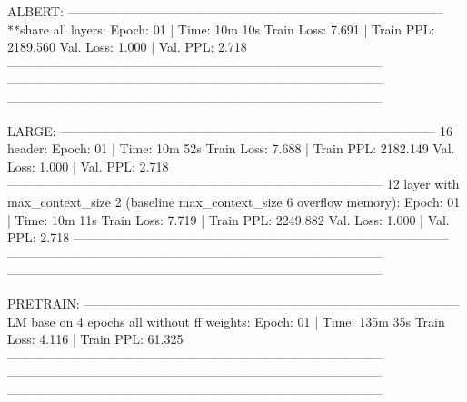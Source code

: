 \documentclass[letterpaper]{article} %
\begin{document}
\begin{CJK*}{UTF8}{gbsn}
ALBERT:
-----------------------------------------------------------------------------------------
**share all layers:
Epoch: 01 | Time: 10m 10s
	Train Loss: 7.691 | Train PPL: 2189.560
	 Val. Loss: 1.000 |  Val. PPL:   2.718
-----------------------------------------------------------------------------------------
-----------------------------------------------------------------------------------------
-----------------------------------------------------------------------------------------

LARGE:
-----------------------------------------------------------------------------------------
16 header:
Epoch: 01 | Time: 10m 52s
	Train Loss: 7.688 | Train PPL: 2182.149
	 Val. Loss: 1.000 |  Val. PPL:   2.718
-----------------------------------------------------------------------------------------
12 layer with max_context_size 2 (baseline max_context_size 6 overflow memory):
Epoch: 01 | Time: 10m 11s
	Train Loss: 7.719 | Train PPL: 2249.882
	 Val. Loss: 1.000 |  Val. PPL:   2.718
-----------------------------------------------------------------------------------------
-----------------------------------------------------------------------------------------
-----------------------------------------------------------------------------------------

PRETRAIN:
-----------------------------------------------------------------------------------------
LM base on 4 epochs all without ff weights:
Epoch: 01 | Time: 135m 35s
	Train Loss: 4.116 | Train PPL:  61.325
-----------------------------------------------------------------------------------------
-----------------------------------------------------------------------------------------
-----------------------------------------------------------------------------------------



\end{CJK*}
\end{document}
